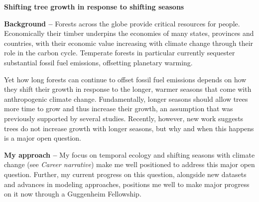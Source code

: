 \documentclass[11pt,letter,oneside]{article}
\begin{document}

\renewcommand{\refname}{\CHead{}}
\begin{centering}
{\bf Shifting tree growth in response to shifting seasons}\\
\end{centering}
\vspace{1.5ex}
%
\doublespacing
{\bf Background --} Forests across the globe provide critical resources for people.\cite{oldekop2020forest,costanza2016sustainable} Economically their timber underpins the economies of many states, provinces and countries, with their economic value increasing with climate change through their role in the carbon cycle. Temperate forests in particular currently sequester substantial fossil fuel emissions, offsetting planetary warming.\cite{pan2011large,griscom2017natural,friedlingstein2022global}

Yet how long forests can continue to offset fossil fuel emissions depends on how they shift their growth in response to the longer, warmer seasons that come with anthropogenic climate change. Fundamentally, longer seasons should allow trees more time to grow and thus increase their growth, an assumption that was previously supported by several studies.\cite{keenan2014net,finzi2020} Recently, however, new work suggests trees do not increase growth with longer seasons,\cite{dow2022} but why and when this happens is a major open question.\cite{wolkovich2025longer}

{\bf My approach --} My focus on temporal ecology and shifting seasons with climate change (see \emph{Career narrative}) make me well positioned to address this major open question. Further, my current progress on this question, alongside new datasets\cite{zhao2019international,nelson2024x} and advances in modeling approaches,\cite{Carpenter:2017stan,gelman2026bayesian} positions me well to make major progress on it now through a Guggenheim Fellowship. 
\end{document}
